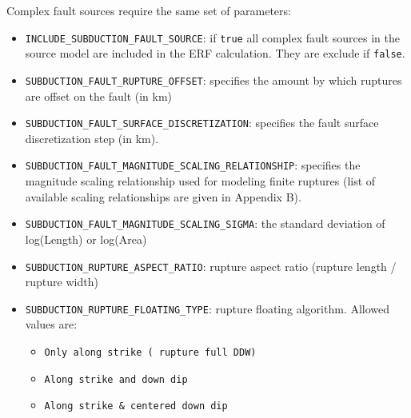 Complex fault sources require the same set of parameters:
\begin{itemize}
\item \Verb+INCLUDE_SUBDUCTION_FAULT_SOURCE+: if \Verb+true+ all complex fault sources in the source model are included in the ERF calculation. They are exclude if \Verb+false+.
\item \Verb+SUBDUCTION_FAULT_RUPTURE_OFFSET+: specifies the amount by which ruptures are offset on the fault (in km)
\item \Verb+SUBDUCTION_FAULT_SURFACE_DISCRETIZATION+: specifies the fault surface discretization step (in km).
\item \Verb+SUBDUCTION_FAULT_MAGNITUDE_SCALING_RELATIONSHIP+: specifies the magnitude scaling relationship used for modeling finite ruptures (list of available scaling relationships are given in Appendix B).
\item \Verb+SUBDUCTION_FAULT_MAGNITUDE_SCALING_SIGMA+: the standard deviation of log(Length) or log(Area)
\item \Verb+SUBDUCTION_RUPTURE_ASPECT_RATIO+: rupture aspect ratio (rupture length / rupture width)
\item \Verb+SUBDUCTION_RUPTURE_FLOATING_TYPE+: rupture floating algorithm. Allowed values are:
\begin{itemize}
\item \Verb+Only along strike ( rupture full DDW)+
\item \Verb+Along strike and down dip+
\item \Verb+Along strike & centered down dip+
\end{itemize}
\end{itemize}


